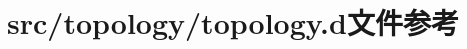 \hypertarget{src_2topology_2topology_8d}{
\section{src/topology/topology.d文件参考}
\label{src_2topology_2topology_8d}
}
